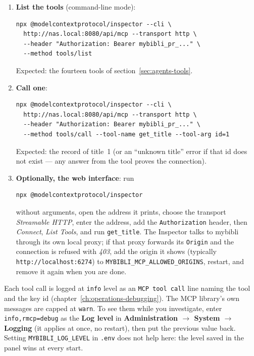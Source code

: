 \begin{enumerate}
  \item \textbf{List the tools} (command-line mode):
\begin{lstlisting}
npx @modelcontextprotocol/inspector --cli \
  http://nas.local:8080/api/mcp --transport http \
  --header "Authorization: Bearer mybibli_pr_..." \
  --method tools/list
\end{lstlisting}
        Expected: the fourteen tools of section~\ref{sec:agents-tools}.
  \item \textbf{Call one}:
\begin{lstlisting}
npx @modelcontextprotocol/inspector --cli \
  http://nas.local:8080/api/mcp --transport http \
  --header "Authorization: Bearer mybibli_pr_..." \
  --method tools/call --tool-name get_title --tool-arg id=1
\end{lstlisting}
        Expected: the record of title~1 (or an ``unknown title''
        error if that id does not exist --- any answer from the tool
        proves the connection).
  \item \textbf{Optionally, the web interface}: run
\begin{lstlisting}
npx @modelcontextprotocol/inspector
\end{lstlisting}
        without arguments, open the address it prints, choose the transport
        \emph{Streamable HTTP}, enter the address, add the
        \texttt{Authorization} header, then \emph{Connect},
        \emph{List Tools}, and run \texttt{get\_title}. The Inspector
        talks to mybibli through its own local proxy; if that proxy
        forwards its \texttt{Origin} and the connection is refused
        with \emph{403}, add the origin it shows (typically
        \texttt{http://localhost:6274}) to
        \texttt{MYBIBLI\_MCP\_ALLOWED\_ORIGINS}, restart, and remove
        it again when you are done.
\end{enumerate}

Each tool call is logged at \texttt{info} level as an \texttt{MCP tool
call} line naming the tool and the key id (chapter~\ref{ch:operations-debugging}).
The MCP library's own messages are capped at \texttt{warn}. To see
them while you investigate, enter \texttt{info,rmcp=debug} as the
\textbf{Log level} in \textbf{Administration \(\rightarrow\) System
\(\rightarrow\) Logging} (it applies at once, no restart), then put
the previous value back. Setting \texttt{MYBIBLI\_LOG\_LEVEL} in
\texttt{.env} does not help here: the level saved in the panel wins at
every start.

